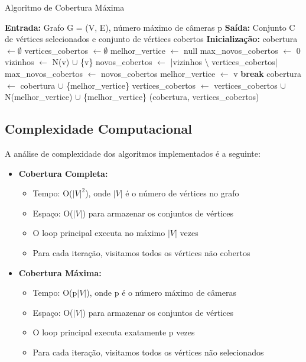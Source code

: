 \documentclass[12pt, a4paper]{report}
\begin{document}
\begin{algorithm}[H]
\caption{Algoritmo de Cobertura Máxima}
\begin{algorithmic}[1]
\State \textbf{Entrada:} Grafo G = (V, E), número máximo de câmeras p
\State \textbf{Saída:} Conjunto C de vértices selecionados e conjunto de vértices cobertos
\Statex
\State \textbf{Inicialização:}
\State cobertura $\gets \emptyset$
\State vertices\_cobertos $\gets \emptyset$
\Statex
{}
    \State melhor\_vertice $\gets$ null
    \State max\_novos\_cobertos $\gets$ 0
            \State vizinhos $\gets$ N(v) $\cup$ \{v\}
            \State novos\_cobertos $\gets$ |vizinhos $\setminus$ vertices\_cobertos|
                \State max\_novos\_cobertos $\gets$ novos\_cobertos
                \State melhor\_vertice $\gets$ v
            \EndIf
        \EndIf
    \EndFor
        \State \textbf{break}
    \EndIf
    \State cobertura $\gets$ cobertura $\cup$ \{melhor\_vertice\}
    \State vertices\_cobertos $\gets$ vertices\_cobertos $\cup$ N(melhor\_vertice) $\cup$ \{melhor\_vertice\}
\EndFor
\State \Return (cobertura, vertices\_cobertos)
\end{algorithmic}
\end{algorithm}

\subsection{Complexidade Computacional}
A análise de complexidade dos algoritmos implementados é a seguinte:

\begin{itemize}
    \item \textbf{Cobertura Completa:}
    \begin{itemize}
        \item Tempo: O($\lvert V \rvert^2$), onde $\lvert V \rvert$ é o número de vértices no grafo
        \item Espaço: O($\lvert V \rvert$) para armazenar os conjuntos de vértices
        \item O loop principal executa no máximo $\lvert V \rvert$ vezes
        \item Para cada iteração, visitamos todos os vértices não cobertos
    \end{itemize}
    
    \item \textbf{Cobertura Máxima:}
    \begin{itemize}
        \item Tempo: O(p$\lvert V \rvert$), onde p é o número máximo de câmeras
        \item Espaço: O($\lvert V \rvert$) para armazenar os conjuntos de vértices
        \item O loop principal executa exatamente p vezes
        \item Para cada iteração, visitamos todos os vértices não selecionados
    \end{itemize}
\end{itemize}
\end{document}
